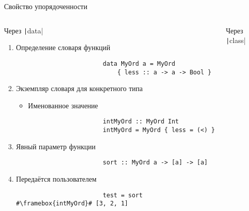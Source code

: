     \begin{frame}[fragile]{Свойство упорядоченности}
        \vspace{-1.3em}
        \begin{columns}[onlytextwidth]
            \begin{column}[t]{0.485\textwidth}
                \begin{block}{Через \texttt|data|}
                    \begin{enumerate}
                        \item Определение словаря функций
                        \begin{verbatim}
                        data MyOrd a = MyOrd
                            { less :: a -> a -> Bool }
                        \end{verbatim}
                        \item Экземпляр словаря для конкретного типа
                        \begin{itemize}
                            \item Именованное значение
                        \end{itemize}
                        \begin{verbatim}
                        intMyOrd :: MyOrd Int
                        intMyOrd = MyOrd { less = (<) }
                        \end{verbatim}
                        \item Явный параметр функции
                        \begin{verbatim}
                        sort :: MyOrd a -> [a] -> [a]
                        \end{verbatim}
                        \item Передаётся пользователем
                        \begin{verbatim}
                        test = sort #\framebox{intMyOrd}# [3, 2, 1]
                        \end{verbatim}
                    \end{enumerate}
                \end{block}
            \end{column}\hfill%
            \begin{column}[t]{0.485\textwidth}
                \begin{block}{Через \texttt|class|}
                    \begin{enumerate}

\end{enumerate}
\end{block}
\end{column}
\end{columns}
\end{frame}
